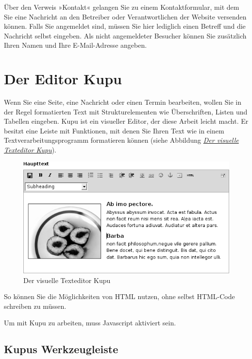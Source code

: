 \documentclass[a4paper,12pt,ngerman]{manual}
\begin{document}
Über den Verweis »Kontakt« gelangen Sie zu einem Kontaktformular, mit dem
Sie eine Nachricht an den Betreiber oder Verantwortlichen der Website
versenden können. Falls Sie angemeldet sind, müssen Sie hier lediglich einen
Betreff und die Nachricht selbst eingeben. Als nicht angemeldeter Besucher
können Sie zusätzlich Ihren Namen und Ihre E-Mail-Adresse angeben.

\resetcurrentobjects
\hypertarget{--doc-oberflaeche/kupu}{}

\hypertarget{sec-kupu}{}\section{Der Editor Kupu}

Wenn Sie eine Seite, eine Nachricht oder einen Termin bearbeiten, wollen Sie
in der Regel formatierten Text mit Strukturelementen wie Überschriften, Listen
und Tabellen eingeben. Kupu ist ein visueller Editor, der diese Arbeit
leicht macht. Er besitzt eine Leiste mit Funktionen, mit denen Sie Ihren Text
wie in einem Textverarbeitungsprogramm formatieren können (siehe
Abbildung \hyperlink{fig-kupu}{\emph{Der visuelle Texteditor Kupu}}).
\hypertarget{fig-kupu}{}\begin{figure}[htbp]
\centering

\includegraphics{kupu.png}
\caption{Der visuelle Texteditor Kupu}\end{figure}

So können Sie die Möglichkeiten von HTML nutzen, ohne selbst HTML-Code
schreiben zu müssen.

Um mit Kupu zu arbeiten, muss Javascript aktiviert sein.


\hypertarget{sec-kupus-symbolleiste}{}\subsection{Kupus Werkzeugleiste}
\end{document}
